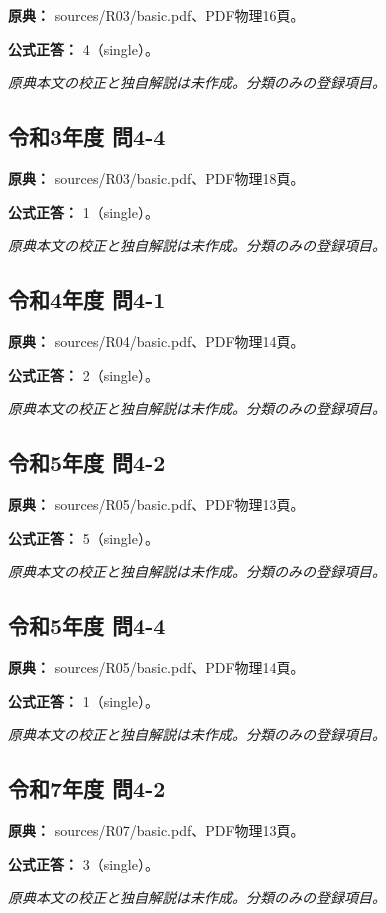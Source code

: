 \noindent\textbf{原典：} sources/R03/basic.pdf、PDF物理16頁。

\textbf{公式正答：} 4（single）。

\par\textit{原典本文の校正と独自解説は未作成。分類のみの登録項目。}

\subsection{令和3年度 問4-4}
\label{q:r03-reg-basic-4-4}

\noindent\textbf{原典：} sources/R03/basic.pdf、PDF物理18頁。

\textbf{公式正答：} 1（single）。

\par\textit{原典本文の校正と独自解説は未作成。分類のみの登録項目。}

\subsection{令和4年度 問4-1}
\label{q:r04-reg-basic-4-1}

\noindent\textbf{原典：} sources/R04/basic.pdf、PDF物理14頁。

\textbf{公式正答：} 2（single）。

\par\textit{原典本文の校正と独自解説は未作成。分類のみの登録項目。}

\subsection{令和5年度 問4-2}
\label{q:r05-reg-basic-4-2}

\noindent\textbf{原典：} sources/R05/basic.pdf、PDF物理13頁。

\textbf{公式正答：} 5（single）。

\par\textit{原典本文の校正と独自解説は未作成。分類のみの登録項目。}

\subsection{令和5年度 問4-4}
\label{q:r05-reg-basic-4-4}

\noindent\textbf{原典：} sources/R05/basic.pdf、PDF物理14頁。

\textbf{公式正答：} 1（single）。

\par\textit{原典本文の校正と独自解説は未作成。分類のみの登録項目。}

\subsection{令和7年度 問4-2}
\label{q:r07-reg-basic-4-2}

\noindent\textbf{原典：} sources/R07/basic.pdf、PDF物理13頁。

\textbf{公式正答：} 3（single）。

\par\textit{原典本文の校正と独自解説は未作成。分類のみの登録項目。}
